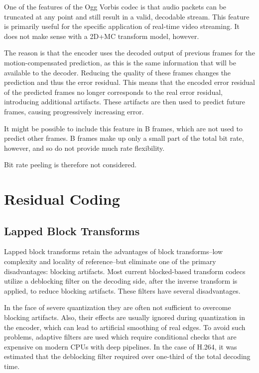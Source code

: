 \documentclass[11pt,letterpaper]{article}
\begin{document}
One of the features of the Ogg Vorbis codec is that audio packets can be
 truncated at any point and still result in a valid, decodable stream.
This feature is primarily useful for the specific application of real-time
 video streaming.
It does not make sense with a 2D+MC transform model, however.

The reason is that the encoder uses the decoded output of previous frames for
 the motion-compensated prediction, as this is the same information that will
 be available to the decoder.
Reducing the quality of these frames changes the prediction and thus the
 error residual.
This means that the encoded error residual of the predicted frames no longer
 corresponds to the real error residual, introducing additional artifacts.
These artifacts are then used to predict future frames, causing progressively
 increasing error.

It might be possible to include this feature in B frames, which are not used to
 predict other frames.
B frames make up only a small part of the total bit rate, however, and so do
 not provide much rate flexibility.

Bit rate peeling is therefore not considered.

\section{Residual Coding}

\subsection{Lapped Block Transforms}

Lapped block transforms retain the advantages of block transforms--low
 complexity and locality of reference--but eliminate one of the primary
 disadvantages: blocking artifacts.
Most current blocked-based transform codecs utilize a deblocking filter on the
 decoding side, after the inverse transform is applied, to reduce blocking
 artifacts.
These filters have several disadvantages.

In the face of severe quantization they are often not sufficient to overcome
 blocking artifacts.
Also, their effects are usually ignored during quantization in the encoder,
 which can lead to artificial smoothing of real edges.
To avoid such problems, adaptive filters are used which require conditional
 checks that are expensive on modern CPUs with deep pipelines.
In the case of H.264, it was estimated that the deblocking filter required over
 one-third of the total decoding time.%
\end{document}
